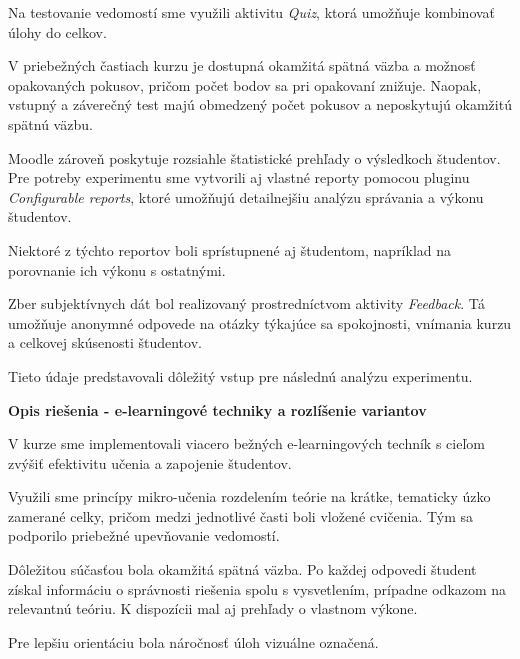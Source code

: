 
Na testovanie vedomostí sme využili aktivitu \textit{Quiz}, ktorá umožňuje kombinovať úlohy do celkov.

V priebežných častiach kurzu je dostupná okamžitá spätná väzba a možnosť opakovaných pokusov, pričom počet bodov sa pri opakovaní znižuje. Naopak, vstupný a záverečný test majú obmedzený počet pokusov a neposkytujú okamžitú spätnú väzbu.


Moodle zároveň poskytuje rozsiahle štatistické prehľady o výsledkoch študentov. Pre potreby experimentu sme vytvorili aj vlastné reporty pomocou pluginu \textit{Configurable reports}, ktoré umožňujú detailnejšiu analýzu správania a výkonu študentov.

Niektoré z týchto reportov boli sprístupnené aj študentom, napríklad na porovnanie ich výkonu s ostatnými.


Zber subjektívnych dát bol realizovaný prostredníctvom aktivity \textit{Feedback}. Tá umožňuje anonymné odpovede na otázky týkajúce sa spokojnosti, vnímania kurzu a celkovej skúsenosti študentov.

Tieto údaje predstavovali dôležitý vstup pre následnú analýzu experimentu.

\textbf{Opis riešenia - e-learningové techniky a rozlíšenie variantov}

V kurze sme implementovali viacero bežných e-learningových techník s cieľom zvýšiť efektivitu učenia a zapojenie študentov.

Využili sme princípy mikro-učenia rozdelením teórie na krátke, tematicky úzko zamerané celky, pričom medzi jednotlivé časti boli vložené cvičenia. Tým sa podporilo priebežné upevňovanie vedomostí.


Dôležitou súčasťou bola okamžitá spätná väzba. Po každej odpovedi študent získal informáciu o správnosti riešenia spolu s vysvetlením, prípadne odkazom na relevantnú teóriu. K dispozícii mal aj prehľady o vlastnom výkone.

Pre lepšiu orientáciu bola náročnosť úloh vizuálne označená.

